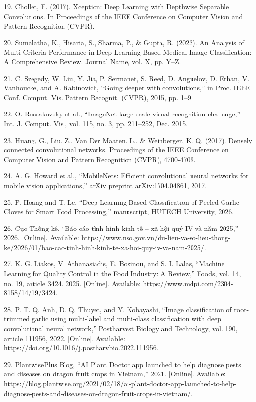 \documentclass[
]{article}
\begin{document}
19. Chollet, F. (2017). Xception: Deep Learning with Depthwise Separable
Convolutions. In Proceedings of the IEEE Conference on Computer Vision
and Pattern Recognition (CVPR).

20. Sumalatha, K., Hisaria, S., Sharma, P., \& Gupta, R. (2023). An
Analysis of Multi-Criteria Performance in Deep Learning-Based Medical
Image Classification: A Comprehensive Review. Journal Name, vol. X, pp.
Y--Z.

21. C. Szegedy, W. Liu, Y. Jia, P. Sermanet, S. Reed, D. Anguelov, D.
Erhan, V. Vanhoucke, and A. Rabinovich, ``Going deeper with
convolutions,'' in Proc. IEEE Conf. Comput. Vis. Pattern Recognit.
(CVPR), 2015, pp. 1--9.

22. O. Russakovsky et al., ``ImageNet large scale visual recognition
challenge,'' Int. J. Comput. Vis., vol. 115, no. 3, pp. 211--252, Dec.
2015.

23. Huang, G., Liu, Z., Van Der Maaten, L., \& Weinberger, K. Q. (2017).
Densely connected convolutional networks. Proceedings of the IEEE
Conference on Computer Vision and Pattern Recognition (CVPR), 4700-4708.

24. A. G. Howard et al., ``MobileNets: Efficient convolutional neural
networks for mobile vision applications,'' arXiv preprint
arXiv:1704.04861, 2017.

25. P. Hoang and T. Le, ``Deep Learning-Based Classification of Peeled
Garlic Cloves for Smart Food Processing,'' manuscript, HUTECH
University, 2026.

26. Cục Thống kê, ``Báo cáo tình hình kinh tế -- xã hội quý IV và năm
2025,'' 2026. {[}Online{]}. Available:
\url{https://www.nso.gov.vn/du-lieu-va-so-lieu-thong-ke/2026/01/bao-cao-tinh-hinh-kinh-te-xa-hoi-quy-iv-va-nam-2025/}.

27. K. G. Liakos, V. Athanasiadis, E. Bozinou, and S. I. Lalas,
``Machine Learning for Quality Control in the Food Industry: A Review,''
Foods, vol. 14, no. 19, article 3424, 2025. {[}Online{]}. Available:
\url{https://www.mdpi.com/2304-8158/14/19/3424}.

28. P. T. Q. Anh, D. Q. Thuyet, and Y. Kobayashi, ``Image classification
of root-trimmed garlic using multi-label and multi-class classification
with deep convolutional neural network,'' Postharvest Biology and
Technology, vol. 190, article 111956, 2022. {[}Online{]}. Available:
\url{https://doi.org/10.1016/j.postharvbio.2022.111956}.

29. PlantwisePlus Blog, ``AI Plant Doctor app launched to help diagnose
pests and diseases on dragon fruit crops in Vietnam,'' 2021.
{[}Online{]}. Available:
\url{https://blog.plantwise.org/2021/02/18/ai-plant-doctor-app-launched-to-help-diagnose-pests-and-diseases-on-dragon-fruit-crops-in-vietnam/}.
\end{document}
